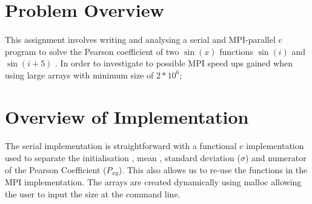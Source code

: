 \documentclass[12pt]{article}
\begin{document}
\maketitle


\section*{Problem Overview}
\paragraph{}
This assignment involves writing and analysing a serial 
and MPI-parallel c program to solve the Pearson coefficient
of two $\sin(x)$ functions $\sin(i)$ and $\sin(i+5)$ .      
In order to investigate to possible MPI speed ups gained when using large arrays with 
minimum size of $2*10^6$;


\section{Overview of Implementation}
\paragraph{}
The serial implementation is straightforward with a functional c implementation used to separate the initialisation , mean , standard deviation ($\sigma$) and numerator of the Pearson Coefficient ($P_{xy}$). This also allows us to re-use the functions in the MPI implementation. 
The arrays are created dynamically using malloc allowing the user to input the size at the command line.  
\end{document}
